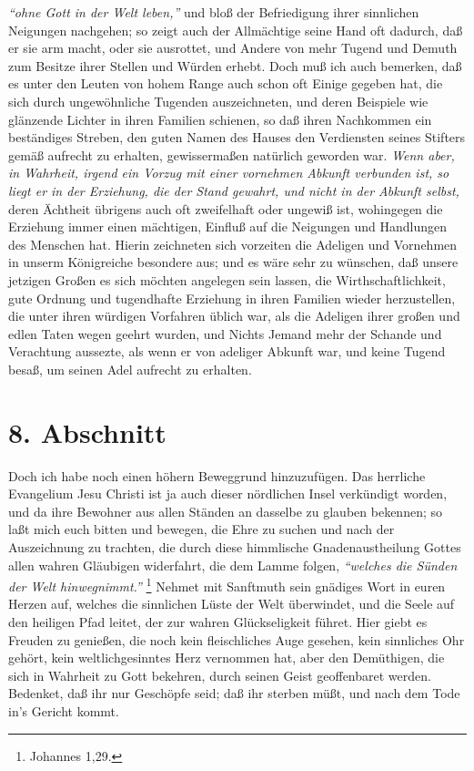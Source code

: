 \textit{"`ohne Gott in der
Welt leben,"'}  und bloß der Befriedigung ihrer sinnlichen Neigungen nachgehen;
so zeigt auch der Allmächtige seine Hand oft dadurch, daß
er sie arm macht, oder
sie ausrottet, und Andere von mehr Tugend und Demuth zum
Besitze ihrer Stellen
und Würden erhebt. Doch muß ich auch bemerken, daß es unter den Leuten von hohem
Range auch schon oft Einige gegeben hat, die sich durch ungewöhnliche Tugenden
auszeichneten, und deren Beispiele wie glänzende Lichter in ihren Familien
schienen, so daß ihren Nachkommen ein beständiges Streben, den guten Namen des
Hauses den Verdiensten seines Stifters gemäß aufrecht zu erhalten, gewissermaßen
natürlich geworden war. \textit{Wenn aber, in Wahrheit, irgend ein Vorzug mit
einer
vornehmen Abkunft verbunden ist, so liegt er in der Erziehung,
die der Stand
gewahrt, und nicht in der Abkunft selbst,} deren Ächtheit übrigens auch oft
zweifelhaft oder ungewiß ist, wohingegen die Erziehung immer einen mächtigen,
Einfluß auf die Neigungen und Handlungen des Menschen hat. Hierin zeichneten
sich vorzeiten die Adeligen und Vornehmen in unserm Königreiche besondere aus;
und es wäre sehr zu wünschen, daß unsere jetzigen Großen es sich möchten
angelegen sein lassen, die Wirthschaftlichkeit, gute Ordnung und tugendhafte
Erziehung in ihren Familien wieder herzustellen, die unter ihren würdigen
Vorfahren üblich war, als die Adeligen ihrer großen und edlen Taten wegen
geehrt wurden, und Nichts Jemand mehr der Schande und Verachtung aussezte, als
wenn er von adeliger Abkunft war, und keine Tugend besaß, um seinen Adel
aufrecht zu erhalten.

\section{8. Abschnitt} \label{kap11_ab8}

Doch ich habe noch einen höhern Beweggrund hinzuzufügen. Das herrliche
Evangelium Jesu Christi ist ja auch dieser nördlichen Insel verkündigt
worden, und da ihre Bewohner aus allen Ständen an dasselbe zu glauben bekennen;
so laßt mich euch bitten und bewegen, die Ehre zu suchen und nach der
Auszeichnung zu trachten, die durch diese himmlische
Gnadenaustheilung Gottes
allen wahren Gläubigen widerfahrt, die dem Lamme folgen,
\textit{"`welches die Sünden
der Welt hinwegnimmt."'}
\footnote{Johannes 1,29.}
Nehmet mit Sanftmuth sein gnädiges
Wort in euren Herzen auf, welches die sinnlichen Lüste der Welt
überwindet, und
die Seele auf den heiligen Pfad leitet, der zur wahren Glückseligkeit führet.
Hier giebt es Freuden zu genießen, die noch kein fleischliches Auge gesehen,
kein sinnliches Ohr gehört, kein weltlichgesinntes Herz vernommen hat, aber den
Demüthigen, die sich in Wahrheit zu Gott bekehren, durch seinen Geist
geoffenbaret werden. Bedenket, daß ihr nur Geschöpfe seid; daß ihr sterben müßt,
und nach dem Tode in’s Gericht kommt.

